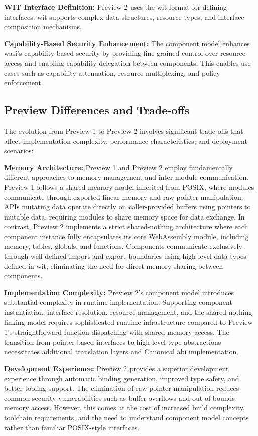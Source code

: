\textbf{WIT Interface Definition:} Preview 2 uses the \acrshort{wit} format for defining interfaces. \acrshort{wit} supports complex data structures, resource types, and interface composition mechanisms.

\textbf{Capability-Based Security Enhancement:} The component model enhances \acrshort{wasi}'s capability-based security by providing fine-grained control over resource access and enabling capability delegation between components. This enables use cases such as capability attenuation, resource multiplexing, and policy enforcement.

\subsection{Preview Differences and Trade-offs}
\label{subsec:preview-differences}
The evolution from Preview 1 to Preview 2 involves significant trade-offs that affect implementation complexity, performance characteristics, and deployment scenarios:

\textbf{Memory Architecture:} Preview 1 and Preview 2 employ fundamentally different approaches to memory management and inter-module communication. Preview 1 follows a shared memory model inherited from POSIX, where modules communicate through exported linear memory and raw pointer manipulation. APIs mutating data operate directly on caller-provided buffers using pointers to mutable data, requiring modules to share memory space for data exchange. In contrast, Preview 2 implements a strict shared-nothing architecture where each component instance fully encapsulates its core WebAssembly module, including memory, tables, globals, and functions. Components communicate exclusively through well-defined import and export boundaries using high-level data types defined in \acrshort{wit}, eliminating the need for direct memory sharing between components.

\textbf{Implementation Complexity:} Preview 2's component model introduces substantial complexity in runtime implementation. Supporting component instantiation, interface resolution, resource management, and the shared-nothing linking model requires sophisticated runtime infrastructure compared to Preview 1's straightforward function dispatching with shared memory access. The transition from pointer-based interfaces to high-level type abstractions necessitates additional translation layers and Canonical \acrshort{abi} implementation.

\textbf{Development Experience:} Preview 2 provides a superior development experience through automatic binding generation, improved type safety, and better tooling support. The elimination of raw pointer manipulation reduces common security vulnerabilities such as buffer overflows and out-of-bounds memory access. However, this comes at the cost of increased build complexity, toolchain requirements, and the need to understand component model concepts rather than familiar POSIX-style interfaces.

